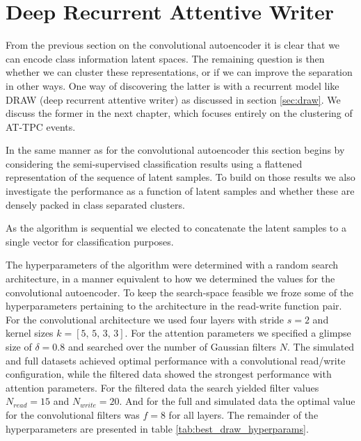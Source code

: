 \section{Deep Recurrent Attentive Writer }

From the previous section on the convolutional autoencoder it is clear that we can encode class information latent spaces. The remaining question is then whether we can cluster these representations, or if we can improve the separation in other ways. One way of discovering the latter is with a recurrent model like DRAW (deep recurrent attentive writer) as discussed in section \ref{sec:draw}. We discuss the former in the next chapter, which focuses entirely on the clustering of AT-TPC events.

In the same manner as for the convolutional autoencoder this section begins by considering the semi-supervised classification results using a flattened representation of the sequence of latent samples. To build on those results we also investigate the performance as a function of latent samples and whether these are densely packed in class separated clusters.

As the algorithm is sequential we elected to concatenate the latent samples to a single vector for classification purposes.

The hyperparameters of the algorithm were determined with a random search architecture, in a manner equivalent to how we determined the values for the convolutional autoencoder. To keep the search-space feasible we froze some of the hyperparameters pertaining to the architecture in the read-write function pair. For the convolutional architecture we used four layers with stride $s=2$ and kernel sizes $k= [5,\, 5,\, 3,\, 3]$. For the attention parameters we specified a glimpse size of $\delta=0.8$ and searched over the number of Gaussian filters $N$. The simulated and full datasets achieved optimal performance with a convolutional read/write configuration, while the filtered data showed the strongest performance with attention parameters. For the filtered data the search yielded filter values $N_{read} = 15$ and $N_{write}=20$. And for the full and simulated data the optimal value for the convolutional filters was $f=8$ for all layers. The remainder of the hyperparameters are presented in table \ref{tab:best_draw_hyperparams}.



